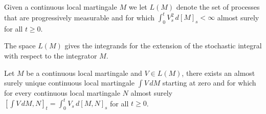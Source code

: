 \begin{defn}Given a continuous local martingale $M$ we let $L(M)$ denote the set of processes that are progressively measurable and for which $\int_0^t V^2_s \, d[M]_s < \infty$ almost surely for all $t \geq 0$.
\end{defn}
The space $L(M)$ gives the integrands for the extension of the stochastic integral with respect to the integrator $M$.
\begin{thm}\label{StochasticIntegralContinuousLocalMartingaleIntegrator}Let $M$ be a continuous local martingale and $V \in L(M)$, there exists an almost surely unique continuous local martingale $\int V \, dM$ starting at zero and for which for every continuous local martingale $N$ almost surely
$[\int V \, dM, N]_t = \int_0^t V_s \, d[M,N]_s$ for all $t \geq 0$.
\end{thm}
